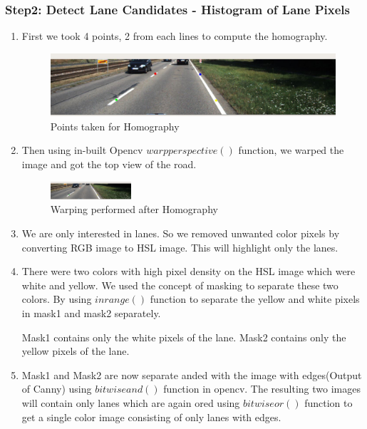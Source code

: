 \documentclass[12pt]{article}
\begin{document}
\subsubsection{Step2: Detect Lane Candidates - Histogram of Lane Pixels}
\begin{enumerate}
\item First we took 4 points, 2  from each lines to compute the homography.
\begin{figure}[h]
    \centering
    \includegraphics[width=14cm]{homographypoints}
    \caption{Points taken for Homography}
    \label{fig:homographypoints}
\end{figure}

\item Then using in-built Opencv $warpperspective()$ function, we warped the image and got the top view of the road.
\begin{figure}[h]
    \centering
    \includegraphics[width=3cm]{homography}
    \caption{Warping performed after Homography}
    \label{fig:homography}
\end{figure}

\item We are only interested in lanes. So we removed unwanted color pixels by converting RGB image to HSL image. This will highlight only the lanes.

\item There were two colors with high pixel density on the HSL image which were white and yellow. We used the concept of masking to separate these two colors. By using $inrange()$ function to separate the yellow and white pixels in mask1 and mask2 separately.

Mask1 contains only the white pixels of the lane.
Mask2 contains only the yellow pixels of the lane.

\item Mask1 and Mask2 are now separate anded with the image with edges(Output of Canny) using $bitwiseand()$ function in opencv. The resulting two images will contain only lanes which are again ored using $bitwiseor()$ function to get a single color image consisting of only lanes with edges. 


\end{enumerate}
\end{document}
